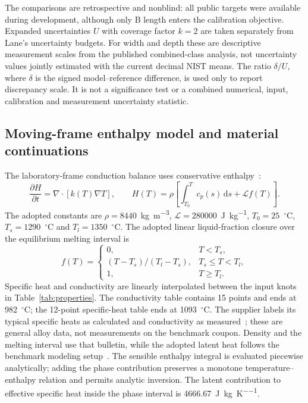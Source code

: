 The comparisons are retrospective and nonblind: all public targets were available during development, although only B length enters the calibration objective. Expanded uncertainties $U$ with coverage factor $k=2$ are taken separately from Lane's uncertainty budgets. For width and depth these are descriptive measurement scales from the published combined-class analysis, not uncertainty values jointly estimated with the current decimal NIST means. The ratio $\delta/U$, where $\delta$ is the signed model--reference difference, is used only to report discrepancy scale. It is not a significance test or a combined numerical, input, calibration and measurement uncertainty statistic.

\subsection{Moving-frame enthalpy model and material continuations}
The laboratory-frame conduction balance uses conservative enthalpy~\cite{vanelsen2007}:
\begin{equation}
 \frac{\partial H}{\partial t}=\nabla\cdot[k(T)\nabla T],\qquad
 H(T)=\rho\left[\int_{T_0}^{T}c_p(s)\,\mathrm ds+\mathcal L f(T)\right].
 \label{eq:enthalpy}
\end{equation}
The adopted constants are $\rho=8440$~\si{\kilogram\per\cubic\metre}, $\mathcal L=280000$~\si{\joule\per\kilogram}, $T_0=25$~$^\circ$C, $T_s=1290$~$^\circ$C and $T_l=1350$~$^\circ$C. The adopted linear liquid-fraction closure over the equilibrium melting interval is~\cite{dynamic2024}
\begin{equation}
 f(T)=\begin{cases}
 0,&T<T_s,\\
 (T-T_s)/(T_l-T_s),&T_s\leq T<T_l,\\
 1,&T\geq T_l.
 \end{cases}
\end{equation}
Specific heat and conductivity are linearly interpolated between the input knots in Table~\ref{tab:properties}. The conductivity table contains 15 points and ends at 982~$^\circ$C; the 12-point specific-heat table ends at 1093~$^\circ$C. The supplier labels its typical specific heats as calculated and conductivity as measured~\cite{specialmetals625}; these are general alloy data, not measurements on the benchmark coupon. Density and the melting interval use that bulletin, while the adopted latent heat follows the benchmark modeling setup~\cite{kollmannsberger2019}. The sensible enthalpy integral is evaluated piecewise analytically; adding the phase contribution preserves a monotone temperature--enthalpy relation and permits analytic inversion. The latent contribution to effective specific heat inside the phase interval is 4666.67~\si{\joule\per\kilogram\per\kelvin}.

